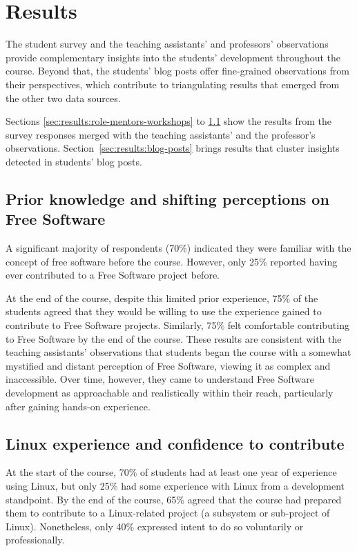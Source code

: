 \section{Results}
\label{sec:results}

The student survey and the teaching assistants' and professors' observations
provide complementary insights into the students' development throughout the
course. Beyond that, the students' blog posts offer fine-grained observations
from their perspectives, which contribute to triangulating results that emerged
from the other two data sources.

Sections \ref{sec:results:role-mentors-workshops} to
\ref{sec:results:prior-knowledge-perceptions} show the results from the survey
responses merged with the teaching assistants' and the professor's observations.
Section~\ref{sec:results:blog-posts} brings results that cluster insights
detected in students' blog posts.

\subsection{Prior knowledge and shifting perceptions on Free Software}
\label{sec:results:prior-knowledge-perceptions}

A significant majority of respondents (70\%) indicated they were familiar with
the concept of free software before the course. However, only 25\% reported
having ever contributed to a Free Software project before.

At the end of the course, despite this limited prior experience, 75\% of the
students agreed that they would be willing to use the experience gained to
contribute to Free Software projects. Similarly, 75\% felt comfortable
contributing to Free Software by the end of the course. These results are
consistent with the teaching assistants' observations that students began the
course with a somewhat mystified and distant perception of Free Software,
viewing it as complex and inaccessible. Over time, however, they came to
understand Free Software development as approachable and realistically within
their reach, particularly after gaining hands-on experience.

\subsection{Linux experience and confidence to contribute}

At the start of the course, 70\% of students had at least one year of experience
using Linux, but only 25\% had some experience with Linux from a development
standpoint. By the end of the course, 65\% agreed that the course had prepared
them to contribute to a Linux-related project (a subsystem or sub-project of
Linux). Nonetheless, only 40\% expressed intent to do so voluntarily or
professionally.

